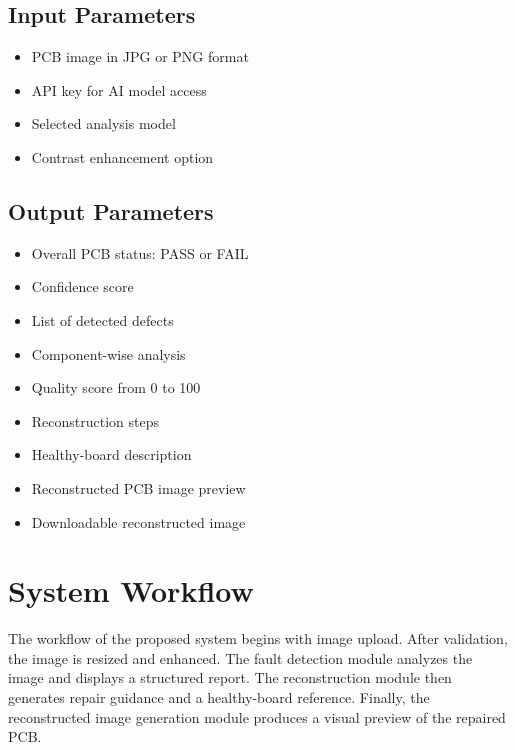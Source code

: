 \documentclass[12pt,a4paper]{report}
\begin{document}
\section{Input Parameters}

\begin{itemize}
    \item PCB image in JPG or PNG format
    \item API key for AI model access
    \item Selected analysis model
    \item Contrast enhancement option
\end{itemize}

\section{Output Parameters}

\begin{itemize}
    \item Overall PCB status: PASS or FAIL
    \item Confidence score
    \item List of detected defects
    \item Component-wise analysis
    \item Quality score from 0 to 100
    \item Reconstruction steps
    \item Healthy-board description
    \item Reconstructed PCB image preview
    \item Downloadable reconstructed image
\end{itemize}

\chapter{System Workflow}

The workflow of the proposed system begins with image upload. After validation, the image is resized and enhanced. The fault detection module analyzes the image and displays a structured report. The reconstruction module then generates repair guidance and a healthy-board reference. Finally, the reconstructed image generation module produces a visual preview of the repaired PCB.
\end{document}
